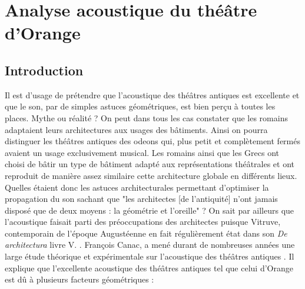\part{Analyse acoustique du théâtre d'Orange}
\label{part3}

\chapter*{Introduction}
	
 Il est d'usage de prétendre que l'acoustique des théâtres antiques est excellente et que le son, par de simples astuces géométriques, est bien perçu à toutes les places. Mythe ou réalité ? On peut dans tous les cas constater que les romains adaptaient leurs architectures aux usages des bâtiments. Ainsi on pourra distinguer les théâtres antiques des \glspl{odeon} qui, plus petit et complètement fermés avaient un usage exclusivement musical. Les romains ainsi que les Grecs ont choisi de bâtir un type de bâtiment adapté aux représentations théâtrales et ont reproduit de manière assez similaire cette architecture globale en différents lieux. Quelles étaient donc les astuces architecturales permettant d'optimiser la propagation du son sachant que "les architectes [de l'antiquité] n'ont jamais disposé que de deux moyens : la géométrie et l'oreille" \cite[p.15]{canac} ? On sait par ailleurs que l'acoustique faisait parti des préoccupations des architectes puisque Vitruve, contemporain de l'époque Augustéenne en fait régulièrement état dans son \textit{De architectura} livre V. \cite[Livre V]{vitruve}. François Canac, a mené durant de nombreuses années une large étude théorique et expérimentale sur l'acoustique des théâtres antiques \cite{canac}. Il explique que l'excellente acoustique des théâtres antiques tel que celui d'Orange est dû à plusieurs facteurs géométriques :
